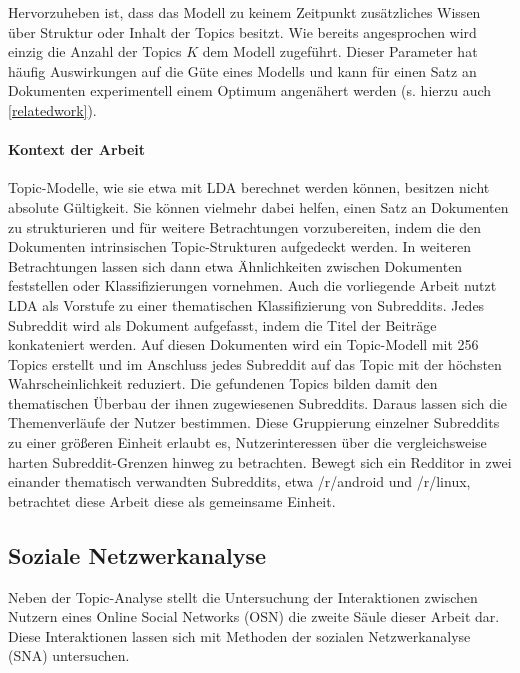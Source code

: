 \documentclass[11pt,a4paper,twoside]{article}
\let\oldpar\paragraph
\renewcommand{\paragraph}{\oldpar*}
\begin{document}
Hervorzuheben ist, dass das Modell zu keinem Zeitpunkt zusätzliches
Wissen über Struktur oder Inhalt der Topics besitzt. Wie bereits
angesprochen wird einzig die Anzahl der Topics \(K\) dem Modell
zugeführt. Dieser Parameter hat häufig Auswirkungen auf die Güte eines
Modells und kann für einen Satz an Dokumenten experimentell einem
Optimum angenähert werden (s. hierzu auch \ref{relatedwork}).

\hypertarget{kontext-der-arbeit-1}{%
\paragraph{Kontext der Arbeit}\label{kontext-der-arbeit-1}}

Topic-Modelle, wie sie etwa mit LDA berechnet werden können, besitzen
nicht absolute Gültigkeit. Sie können vielmehr dabei helfen, einen Satz
an Dokumenten zu strukturieren und für weitere Betrachtungen
vorzubereiten, indem die den Dokumenten intrinsischen Topic-Strukturen
aufgedeckt werden. In weiteren Betrachtungen lassen sich dann etwa
Ähnlichkeiten zwischen Dokumenten feststellen oder Klassifizierungen
vornehmen. Auch die vorliegende Arbeit nutzt LDA als Vorstufe zu einer
thematischen Klassifizierung von Subreddits. Jedes Subreddit wird als
Dokument aufgefasst, indem die Titel der Beiträge konkateniert werden.
Auf diesen Dokumenten wird ein Topic-Modell mit 256 Topics erstellt und
im Anschluss jedes Subreddit auf das Topic mit der höchsten
Wahrscheinlichkeit reduziert. Die gefundenen Topics bilden damit den
thematischen Überbau der ihnen zugewiesenen Subreddits. Daraus lassen
sich die Themenverläufe der Nutzer bestimmen. Diese Gruppierung
einzelner Subreddits zu einer größeren Einheit erlaubt es,
Nutzerinteressen über die vergleichsweise harten Subreddit-Grenzen
hinweg zu betrachten. Bewegt sich ein Redditor in zwei einander
thematisch verwandten Subreddits, etwa /r/android und /r/linux,
betrachtet diese Arbeit diese als gemeinsame Einheit.

\hypertarget{sna}{%
\subsection{Soziale Netzwerkanalyse}\label{sna}}

Neben der Topic-Analyse stellt die Untersuchung der Interaktionen
zwischen Nutzern eines Online Social Networks (OSN) die zweite Säule
dieser Arbeit dar. Diese Interaktionen lassen sich mit Methoden der
sozialen Netzwerkanalyse (SNA) untersuchen.
\end{document}
